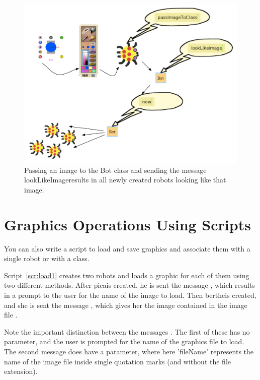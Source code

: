 \documentclass[a4paper,10pt,twoside]{book}
\begin{document}
\begin{figure}[h]
\begin{center}
\includegraphics[width=\textwidth]{allGraphics2}
\end{center}
\caption{Passing an image to the Bot class and sending the message lookLikeImageresults in 
all newly created robots looking like that image. \label{fig:allGraphics}}
\end{figure}

\section{Graphics Operations Using Scripts}

You can also write a script to load and save graphics and associate them with a single robot or 
with a class. 

Script~\ref{scr:load1} creates two robots and loads a graphic for each of them using two different 
methods. After picais created, he is sent the message , which results in a prompt to 
the user for the name of the image to load. Then bertheis created, and she is sent the message 
, which gives her the image contained in the image file . 

Note the important distinction between the messages . 
The first of these has no parameter, and the user is prompted for the name of 
the graphics file to load. The second message does have a parameter, where here 'fileName' 
represents the name of the image file inside single quotation marks (and without the file 
extension). 
\end{document}
